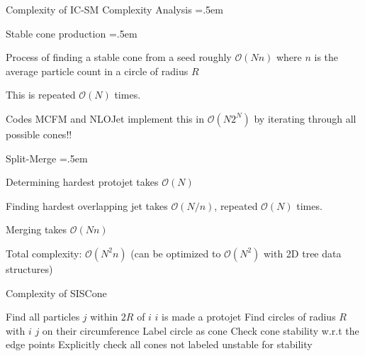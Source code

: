 \documentclass[xcolor={dvipsnames}]{beamer}
\let\olditemize=\itemize
\let\endolditemize=\enditemize
\renewenvironment{itemize}{\olditemize \itemsep=.5em }{\endolditemize}
\newcommand{\ord}[1]{\mathcal{O}(#1)}
\begin{document}
\begin{frame}{Complexity of IC-SM}
\alert{Complexity Analysis}
\begin{itemize}
    \item<2->Stable cone production 
    \begin{itemize}
        \item<3-> Process of finding a stable cone from a seed roughly $\ord{Nn}$ where $n$ is the average particle count in a circle of radius $R$
        \item<4-> This is repeated $\ord{N}$ times.
        \item<5-> Codes MCFM and NLOJet implement this in $\ord{N 2^N}$ by iterating through all possible cones!!
    \end{itemize}
    \item<6-> Split-Merge
    \begin{itemize}
        \item<7-> Determining hardest protojet takes $\ord{N}$
        \item<8-> Finding hardest overlapping jet takes $\ord{N/n}$, repeated $\ord{N}$ times.
        \item<9-> Merging takes $\ord{Nn}$
    \end{itemize}
    \item<10-> Total complexity: $\ord{N^2n}$ (can be optimized to $\ord{N^2}$ with 2D tree data structures)
\end{itemize}
\end{frame}

\begin{frame}{Complexity of SISCone}
\begin{algorithm}[H]
    \caption{SISCone}
    \begin{algorithmic}[1]
            \State Find all particles $j$ within $2R$ of $i$
                \State $i$ is made a protojet
            \Else
                \State Find circles of radius $R$ with $i$ $j$ on their circumference
                        \State Label circle as cone
                        \State Check cone stability w.r.t the edge points
                    \EndFor
                \EndFor
            \EndIf
        \EndFor
        \State Explicitly check all cones not labeled unstable for stability
    \end{algorithmic}
\end{algorithm}
\end{frame}
\end{document}
